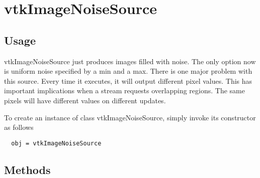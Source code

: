 \section{vtkImageNoiseSource}

\subsection{Usage}

 vtkImageNoiseSource just produces images filled with noise.  The only
 option now is uniform noise specified by a min and a max.  There is one
 major problem with this source. Every time it executes, it will output
 different pixel values.  This has important implications when a stream
 requests overlapping regions.  The same pixels will have different values
 on different updates.

To create an instance of class vtkImageNoiseSource, simply
invoke its constructor as follows
\begin{verbatim}
  obj = vtkImageNoiseSource
\end{verbatim}
\subsection{Methods}

